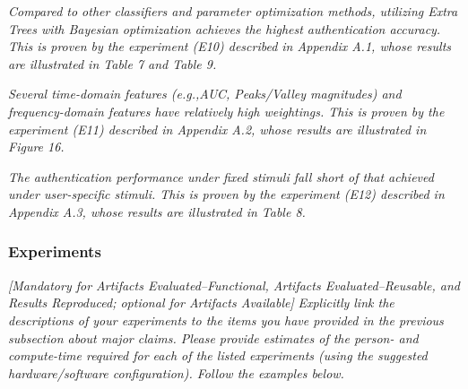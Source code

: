 \documentclass[sigconf]{acmart}
\begin{document}
\begin{compactitem}
\item[(C9):]
  \emph{Compared to other classifiers and parameter optimization methods, utilizing Extra Trees with Bayesian optimization achieves the highest authentication accuracy. This is proven by the experiment (E10) described in Appendix A.1,  whose results are illustrated in Table 7 and Table 9.}

\item[(C10):]
  \emph{Several time-domain features (e.g.,AUC, Peaks/Valley magnitudes) and frequency-domain features have relatively high weightings. This is proven by the experiment (E11) described in Appendix A.2, whose results are illustrated in Figure 16.}

\item[(C11):]
  \emph{The authentication performance under fixed stimuli fall short of that achieved under user-specific stimuli. This is proven by the experiment (E12) described in Appendix A.3, whose results are illustrated in Table 8.}
\end{compactitem}


\subsubsection{Experiments}

\emph{[Mandatory for \emph{Artifacts Evaluated--Functional},
  \emph{Artifacts Evaluated--Reusable}, and \emph{Results Reproduced};
  optional for \emph{Artifacts Available}]}
%
\emph{Explicitly link the descriptions of your experiments to the
items you have provided in the previous subsection about major claims.
Please provide estimates of the person- and compute-time required for
each of the listed experiments (using the suggested hardware/software
configuration).  Follow the examples below.}
\end{document}
